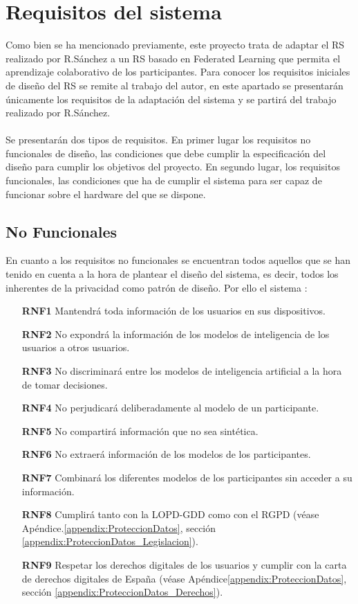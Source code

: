 \section{Requisitos del sistema}
Como bien se ha mencionado previamente, este proyecto trata de adaptar el RS realizado por R.Sánchez \autocite{sanchez-corcueraPersuasionbasedRecommenderSystem2020} a un RS basado en Federated Learning que permita el aprendizaje colaborativo de los participantes. Para conocer los requisitos iniciales de diseño del RS se remite al trabajo del autor, en este apartado se presentarán únicamente los requisitos de la adaptación del sistema y se partirá del trabajo realizado por R.Sánchez. 
\\ \\
Se presentarán dos tipos de requisitos. En primer lugar los requisitos no funcionales de diseño, las condiciones que debe cumplir la especificación del diseño para cumplir los objetivos del proyecto. En segundo lugar, los requisitos funcionales, las condiciones que ha de cumplir el sistema para ser capaz de funcionar sobre el hardware del que se dispone.

\subsection{No Funcionales}
En cuanto a los requisitos no funcionales se encuentran todos aquellos que se han tenido en cuenta a la hora de plantear el diseño del sistema, es decir, todos los inherentes de la privacidad como patrón de diseño. Por ello el sistema :
\begin{itemize}
    \item [\textbf{RNF1}] Mantendrá toda información de los usuarios en sus dispositivos.
    \item [\textbf{RNF2}] No expondrá la información de los modelos de inteligencia de los usuarios a otros usuarios.
    \item [\textbf{RNF3}] No discriminará entre los modelos de inteligencia artificial a la hora de tomar decisiones.
    \item [\textbf{RNF4}] No perjudicará deliberadamente al modelo de un participante.
    \item [\textbf{RNF5}] No compartirá información que no sea sintética.
    \item [\textbf{RNF6}] No extraerá información de los modelos de los participantes.
    \item [\textbf{RNF7}] Combinará los diferentes modelos de los participantes sin acceder a su información.
    \item [\textbf{RNF8}] Cumplirá tanto con la LOPD-GDD como con el RGPD (véase Apéndice.\ref{appendix:ProteccionDatos}, sección \ref{appendix:ProteccionDatos_Legislacion}).
    \item [\textbf{RNF9}] Respetar los derechos digitales de los usuarios y cumplir con la carta de derechos digitales de España (véase Apéndice\ref{appendix:ProteccionDatos}, sección \ref{appendix:ProteccionDatos_Derechos}).
\end{itemize}

